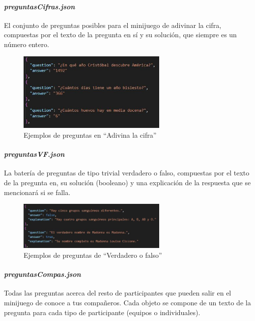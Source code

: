 \paragraph{\textit{preguntasCifras.json}}

El conjunto de preguntas posibles para el minijuego de adivinar la cifra, compuestas por el texto de la pregunta en sí y su solución, que siempre es un número entero.

\begin{figure}[H]
	\centering
	\includegraphics[width=0.65\textwidth]{imgs/exp-cifras.jpg}
	\caption{Ejemplos de preguntas en \enquote{Adivina la cifra}}
	\label{fig:exp-cifras}
\end{figure}

\paragraph{\textit{preguntasVF.json}}

La batería de preguntas de tipo trivial verdadero o falso, compuestas por el texto de la pregunta en, su solución (booleano) y una explicación de la respuesta que se mencionará si se falla.

\begin{figure}[H]
	\centering
	\includegraphics[width=0.65\textwidth]{imgs/exp-vyf.jpg}
	\caption{Ejemplos de preguntas de \enquote{Verdadero o falso}}
	\label{fig:exp-vyf}
\end{figure}

\paragraph{\textit{preguntasCompas.json}}

Todas las preguntas acerca del resto de participantes que pueden salir en el minijuego de conoce a tus compañeros. Cada objeto se compone de un texto de la pregunta para cada tipo de participante (equipos o individuales).

